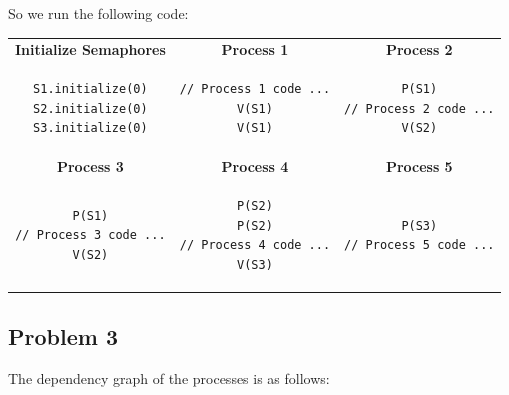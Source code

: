 \documentclass[english]{article}
\begin{document}
So we run the following code:
\begin{table}[h!]
\begin{tabular}{|c|c|c|}
\hline
\textbf{Initialize Semaphores} & \textbf{Process 1} & \textbf{Process 2}  \\

\begin{lstlisting}
S1.initialize(0)
S2.initialize(0)
S3.initialize(0)
\end{lstlisting}
 & 
 \begin{lstlisting}
// Process 1 code ...
V(S1)
V(S1)
\end{lstlisting}
& 
\begin{lstlisting}
P(S1)
// Process 2 code ...
V(S2)
\end{lstlisting} \\ \hline \hline
\textbf{Process 3} & \textbf{Process 4} & \textbf{Process 5} \\

\begin{lstlisting}
P(S1)
// Process 3 code ...
V(S2)
\end{lstlisting}
& 
\begin{lstlisting}
P(S2)
P(S2)
// Process 4 code ...
V(S3)
\end{lstlisting}
&
\begin{lstlisting}
P(S3)
// Process 5 code ...
\end{lstlisting} \\\hline


\end{tabular}
\end{table}


\subsection*{Problem 3}
The dependency graph of the processes is as follows:

\begin{figure}[h!]
\end{figure}
\end{document}
